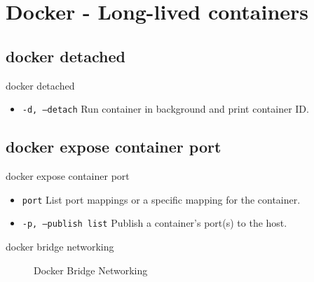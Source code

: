 

\section{Docker - Long-lived containers}\label{sec:docker-long-lived-containers}

\subsection{docker detached}\label{subsec:docker-detached}
\begin{frame}{docker detached}
    \begin{itemize}
        \item \texttt{-d, --detach} Run container in background and print container ID.
        \pause
        
    \end{itemize}
\end{frame}

\subsection{docker expose container port}\label{subsec:docker-expose-container-port}
\begin{frame}{docker expose container port}
    \begin{itemize}
        \item \texttt{port} List port mappings or a specific mapping for the container.
        \pause
        \item \texttt{-p, --publish list} Publish a container's port(s) to the host.
        \pause
        
    \end{itemize}
\end{frame}
\begin{frame}{docker bridge networking}
    \begin{figure}[!t]
        \raggedright
        
        \caption{Docker Bridge Networking}
    \end{figure}
\end{frame}

